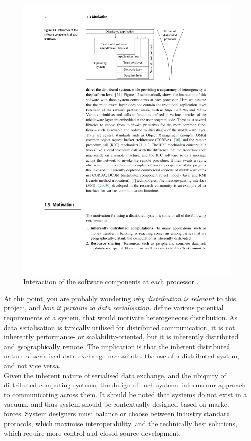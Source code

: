 \documentclass[../report.tex]{subfiles}
\begin{document}
\begin{figure}[h!]
\centering
\includegraphics[width=0.8\linewidth]{figures/processinteraction.pdf}
\caption{Interaction of the software components at each processor \cite[3]{kshemkalyani2011distributed}.}
\label{fig:processinteraction}
\end{figure}

At this point, you are probably wondering \textit{why distribution is relevant} to this project, and \textit{how it pertains to data serialisation.} \cite{kshemkalyani2011distributed} define various potential requirements of a system, that would motivate heterogeneous distribution. As data serialisation is typically utilised for distributed communication, it is not inherently performance- or scalability-oriented, but it is inherently distributed and geographically remote. The implication is that the inherent distributed nature of serialised data exchange necessitates the use of a distributed system, and not vice versa. \\

Given the inherent nature of serialised data exchange, and the ubiquity of distributed computing systems, the design of such systems informs our approach to communicating across them. It should be noted that systems do not exist in a vacuum, and thus system should be contextually designed based on market forces. System designers must balance or choose between industry standard protocols, which maximise interoperability, and the technically best solutions, which require more control and closed source development.
\end{document}
